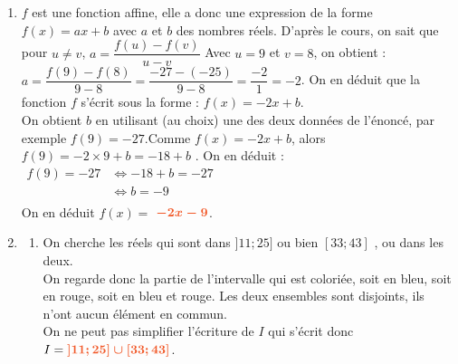 \documentclass[a4paper,11pt]{article}
\newcounter{seancenum}
\begin{document}
\setcounter{seancenum}{12}
\newpage
\begin{seance}{} %
\begin{enumerate}
\item $f$ est une fonction affine, elle a donc une expression de la forme  $f(x)=ax+b$ avec $a$ et $b$ des nombres réels.
D'après le cours, on sait que pour $u\neq v$, $a=\dfrac{f(u)-f(v)}{u-v}$ Avec $u=9$ et  $v=8$, on obtient  :  $a=\dfrac{f(9)-f(8)}{9-8}=\dfrac{-27-(-25)}{9-8}=\dfrac{-2}{1}=-2$. On en déduit que la fonction $f$ s'écrit sous la forme :    $f(x)=-2 x +b.$\\On obtient $b$ en utilisant (au choix) une des deux données de l'énoncé, par exemple $f(9)=-27$.Comme $f(x)=-2x +b$, alors $f(9)=
              -2\times9+b=-18+b$ . On en déduit :\\$\begin{aligned}f(9)=-27&\iff -18+b=-27\\&\iff b=-9\\\end{aligned}$\\On en déduit $f(x)=$ ${\color[HTML]{f15929}\boldsymbol{-2x-9}}$.


\item 

\begin{enumerate}
\item On cherche les réels qui sont dans  $]11;25]$ ou bien  $[33;43]$ , ou dans les deux.\\On regarde donc la partie de l'intervalle qui est coloriée, soit en bleu, soit en rouge, soit en bleu et rouge.
Les deux ensembles sont disjoints, ils n'ont aucun élément en commun.\\
                    On ne peut pas simplifier l'écriture de $I$ qui s'écrit donc $I={\color[HTML]{f15929}\boldsymbol{]11;25]\cup[33;43]}}$.
\end{enumerate}
\end{enumerate}
\end{seance}
\end{document}
